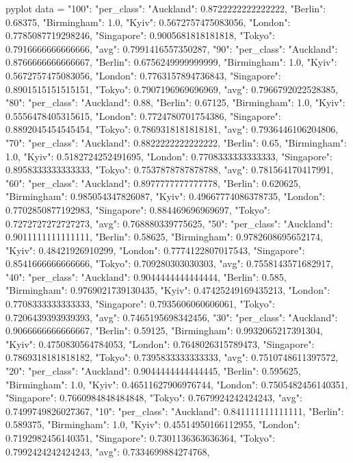 \begin{frame}[fragile]
  \begin{CacheMeCode}{pyplot}
    data = {
      "100": {"per_class": {"Auckland": 0.8722222222222222, "Berlin": 0.68375, "Birmingham": 1.0, "Kyiv": 0.5672757475083056, "London": 0.7785087719298246, "Singapore": 0.9005681818181818, "Tokyo": 0.7916666666666666}, "avg": 0.7991416557350287},
      "90": {"per_class": {"Auckland": 0.8766666666666667, "Berlin": 0.6756249999999999, "Birmingham": 1.0, "Kyiv": 0.5672757475083056, "London": 0.7763157894736843, "Singapore": 0.8901515151515151, "Tokyo": 0.7907196969696969}, "avg": 0.7966792022528385},
      "80": {"per_class": {"Auckland": 0.88, "Berlin": 0.67125, "Birmingham": 1.0, "Kyiv": 0.5556478405315615, "London": 0.7724780701754386, "Singapore": 0.8892045454545454, "Tokyo": 0.7869318181818181}, "avg": 0.7936446106204806},
      "70": {"per_class": {"Auckland": 0.8822222222222222, "Berlin": 0.65, "Birmingham": 1.0, "Kyiv": 0.5182724252491695, "London": 0.7708333333333333, "Singapore": 0.8958333333333333, "Tokyo": 0.7537878787878788}, "avg": 0.781564170417991},
      "60": {"per_class": {"Auckland": 0.8977777777777778, "Berlin": 0.620625, "Birmingham": 0.985054347826087, "Kyiv": 0.49667774086378735, "London": 0.7702850877192983, "Singapore": 0.884469696969697, "Tokyo": 0.7272727272727273}, "avg": 0.768880339775625},
      "50": {"per_class": {"Auckland": 0.9011111111111111, "Berlin": 0.58625, "Birmingham": 0.9782608695652174, "Kyiv": 0.48421926910299, "London": 0.7774122807017543, "Singapore": 0.8541666666666666, "Tokyo": 0.709280303030303}, "avg": 0.7558143571682917},
      "40": {"per_class": {"Auckland": 0.9044444444444444, "Berlin": 0.585, "Birmingham": 0.9769021739130435, "Kyiv": 0.47425249169435213, "London": 0.7708333333333333, "Singapore": 0.7935606060606061, "Tokyo": 0.7206439393939393}, "avg": 0.7465195698342456},
      "30": {"per_class": {"Auckland": 0.9066666666666667, "Berlin": 0.59125, "Birmingham": 0.9932065217391304, "Kyiv": 0.4750830564784053, "London": 0.7648026315789473, "Singapore": 0.7869318181818182, "Tokyo": 0.7395833333333333}, "avg": 0.7510748611397572},
      "20": {"per_class": {"Auckland": 0.9044444444444445, "Berlin": 0.595625, "Birmingham": 1.0, "Kyiv": 0.46511627906976744, "London": 0.7505482456140351, "Singapore": 0.7660984848484848, "Tokyo": 0.7679924242424243}, "avg": 0.7499749826027367},
      "10": {"per_class": {"Auckland": 0.841111111111111, "Berlin": 0.589375, "Birmingham": 1.0, "Kyiv": 0.45514950166112955, "London": 0.7192982456140351, "Singapore": 0.7301136363636364, "Tokyo": 0.7992424242424243}, "avg": 0.7334699884274768},
    }


\end{CacheMeCode}
\end{frame}
